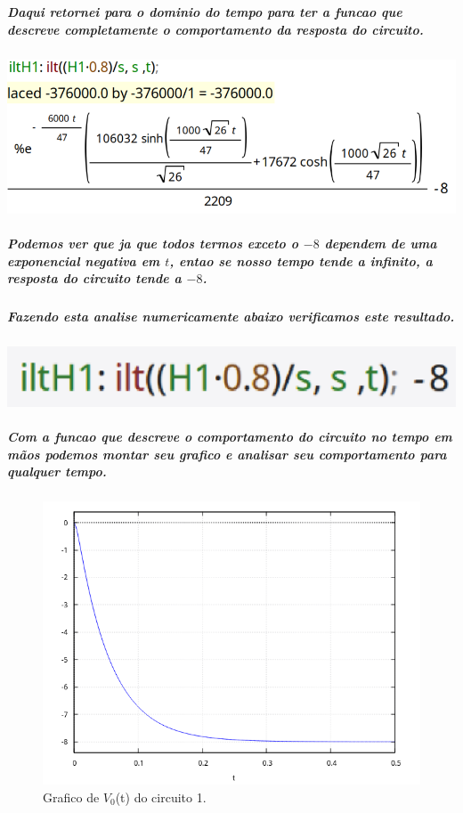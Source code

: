 \documentclass[12pt,twoside, a4paper, twocolumn]{article}
\begin{document}
\subparagraph*{}

\subparagraph*{Daqui retornei para o dominio do tempo para ter a funcao que descreve completamente o comportamento  da resposta do circuito.}
\pagebreak
\subparagraph*{}


\begin{adjustbox}{scale=0.35}
    \includegraphics{iltH1.png}
\end{adjustbox}

\subparagraph*{Podemos ver que ja que todos termos exceto o $-8$ dependem de uma exponencial negativa em $t$, entao se nosso tempo tende a infinito, a resposta do circuito tende a $-8$.}

\subparagraph*{Fazendo esta analise numericamente abaixo verificamos este resultado.}

\subparagraph*{}

\begin{adjustbox}{scale=0.35}
    \includegraphics{limH1.png}
\end{adjustbox}

\subparagraph*{Com a funcao que descreve o comportamento do circuito no tempo em mãos podemos montar seu grafico e analisar seu comportamento para qualquer tempo.}
\subparagraph*{}

\begin{figure}[h]
    \centering
    \includegraphics[width=1\columnwidth]{images/graficoH1t.png}
    \caption{Grafico de $V_0$(t) do circuito 1.}
\end{figure}
\end{document}
